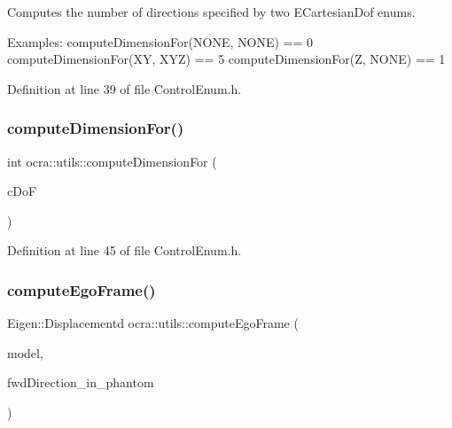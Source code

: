 Computes the number of directions specified by two E\+Cartesian\+Dof enums. 

Examples\+: compute\+Dimension\+For(\+N\+O\+N\+E, N\+O\+N\+E) == 0 compute\+Dimension\+For(\+X\+Y, X\+Y\+Z) == 5 compute\+Dimension\+For(\+Z, N\+O\+N\+E) == 1 

Definition at line 39 of file Control\+Enum.\+h.

\hypertarget{namespaceocra_1_1utils_a27a97693df87c348850488eb7aeed12a}{}\label{namespaceocra_1_1utils_a27a97693df87c348850488eb7aeed12a} 
\subsubsection{\texorpdfstring{compute\+Dimension\+For()}{computeDimensionFor()}\hspace{0.1cm}{\footnotesize\ttfamily [2/2]}}
{\footnotesize\ttfamily int ocra\+::utils\+::compute\+Dimension\+For (\begin{DoxyParamCaption}\item[{\hyperlink{namespaceocra_a436781c7059a0f76027df1c652126260}{E\+Cartesian\+Dof}}]{c\+DoF }\end{DoxyParamCaption})\hspace{0.3cm}{\ttfamily [inline]}}



Definition at line 45 of file Control\+Enum.\+h.

\hypertarget{namespaceocra_1_1utils_aaad3b464589711bcc5fecec8c8b9af76}{}\label{namespaceocra_1_1utils_aaad3b464589711bcc5fecec8c8b9af76} 
\subsubsection{\texorpdfstring{compute\+Ego\+Frame()}{computeEgoFrame()}\hspace{0.1cm}{\footnotesize\ttfamily [1/2]}}
{\footnotesize\ttfamily Eigen\+::\+Displacementd ocra\+::utils\+::compute\+Ego\+Frame (\begin{DoxyParamCaption}\item[{Model \&}]{model,  }\item[{const Vector3d \&}]{fwd\+Direction\+\_\+in\+\_\+phantom }\end{DoxyParamCaption})}



